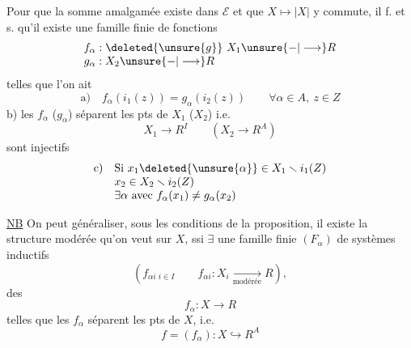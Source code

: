 Pour que la somme amalgamée existe dans  $\mathcal E$ et que $X\mapsto|X|$ y commute, il f. et s. qu'il existe une famille finie de  fonctions
\[
\begin{array}{l}
f_\alpha:\deleted{\unsure{g}}\ X_1\unsure{-|\longrightarrow}R\\
g_\alpha:X_2\unsure{-|\longrightarrow}R
\end{array}
\]
telles que l'on ait
\[
\text{a)}\quad f_\alpha(i_1(z))=g_\alpha(i_2(z))\qquad\forall\alpha\in A,\ z\in Z
\]
b)  les $f_\alpha$ ($g_\alpha$) séparent  les pts de $X_1$ ($X_2$) i.e.
\[
 X_1\longrightarrow R^I\qquad(X_2\longrightarrow R^A)
\]
sont injectifs
\[
\begin{array}{ll}
\text{c)}&\text{Si }x_1\deleted{\unsure{\alpha}}\in X_1\smallsetminus i_1(Z)\\
&x_2\in X_2\smallsetminus i_2(Z)\\
&\exists\alpha\text{ avec }f_\alpha(x_1)\ne g_\alpha(x_2)
\end{array}
\]

\uline{NB} On peut généraliser, sous les conditions de la proposition, il existe la structure modérée qu'on veut sur $X$, ssi $\exists$ une famille finie $(F_\alpha)$  de systèmes inductifs
\[
 (f_{\alpha i}\,{}_{i\in I}\qquad f_{\alpha i}:X_i\underset{\text{modérée}}{\longrightarrow}R),
\]
 des
\[
 f_\alpha:X\longrightarrow R
\]
telles que les $f_\alpha$ séparent les pts de $X$, i.e.
\[
 f=(f_\alpha):X\hookrightarrow R^A
\]
